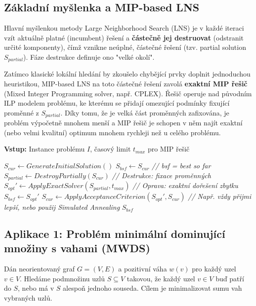\documentclass[12pt,a4paper]{article}
\theoremstyle{definition}
\begin{document}
\subsection{Základní myšlenka a MIP-based LNS}
Hlavní myšlenkou metody Large Neighborhood Search (LNS) je v každé iteraci vzít aktuálně platné (incumbent) řešení a \textbf{částečně jej destruovat} (odstranit určité komponenty), čímž vznikne neúplné, částečné řešení (tzv. partial solution $S_{partial}$). Fáze destrukce definuje ono "velké okolí". 

Zatímco klasické lokální hledání by zkoušelo chybějící prvky doplnit jednoduchou heuristikou, MIP-based LNS na toto částečné řešení zavolá \textbf{exaktní MIP řešič} (Mixed Integer Programming solver, např. CPLEX). Řešič operuje nad původním ILP modelem problému, ke kterému se přidají omezující podmínky fixující proměnné z $S_{partial}$. Díky tomu, že je velká část proměnných zafixována, je problém výpočetně mnohem menší a MIP řešič je schopen v něm najít exaktní (nebo velmi kvalitní) optimum mnohem rychleji než u celého problému.

\begin{algorithm}[H]
\caption{MIP-based Large Neighborhood Search (MIP-LNS)}
\textbf{Vstup:} Instance problému $I$, časový limit $t_{max}$ pro MIP řešič
\begin{algorithmic}[1]
\STATE $S_{cur} \gets GenerateInitialSolution()$
\STATE $S_{bsf} \gets S_{cur}$ \textit{// bsf = best so far}
    \STATE $S_{partial} \gets DestroyPartially(S_{cur})$ \textit{// Destrukce: fixace proměnných}
    \STATE $S_{opt}' \gets ApplyExactSolver(S_{partial}, t_{max})$ \textit{// Oprava: exaktní dořešení zbytku}
        \STATE $S_{bsf} \gets S_{opt}'$
    \ENDIF
    \STATE $S_{cur} \gets ApplyAcceptanceCriterion(S_{opt}', S_{cur})$ \textit{// Např. vždy přijmi lepší, nebo použij Simulated Annealing}
\ENDWHILE
\RETURN $S_{bsf}$
\end{algorithmic}
\end{algorithm}

\subsection{Aplikace 1: Problém minimální dominující množiny s vahami (MWDS)}
Dán neorientovaný graf $G = (V, E)$ a pozitivní váha $w(v)$ pro každý uzel $v \in V$. Hledáme podmnožinu uzlů $S \subseteq V$ takovou, že každý uzel $v \in V$ buď patří do $S$, nebo má v $S$ alespoň jednoho souseda. Cílem je minimalizovat sumu vah vybraných uzlů. 
\end{document}
